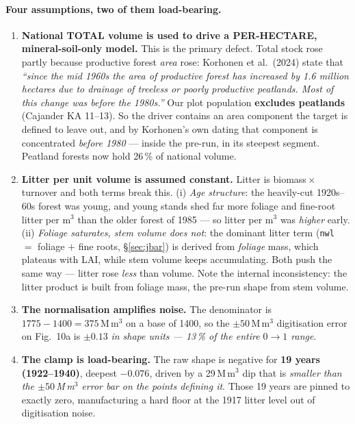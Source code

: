 \documentclass[11pt]{article}
\begin{document}
\paragraph{Four assumptions, two of them load-bearing.}
\begin{enumerate}
\item \textbf{National TOTAL volume is used to drive a PER-HECTARE, mineral-soil-only model.}
      This is the primary defect. Total stock rose partly because productive forest \emph{area} rose:
      Korhonen et al.\ (2024) state that \emph{``since the mid 1960s the area of productive forest has
      increased by 1.6 million hectares due to drainage of treeless or poorly productive peatlands.
      Most of this change was before the 1980s.''} Our plot population \textbf{excludes peatlands}
      (Cajander KA 11--13). So the driver contains an area component the target is defined to leave
      out, and by Korhonen's own dating that component is concentrated \emph{before 1980} --- inside
      the pre-run, in its steepest segment. Peatland forests now hold 26\,\% of national volume.
\item \textbf{Litter per unit volume is assumed constant.} Litter is biomass\,$\times$\,turnover and
      both terms break this. (i) \emph{Age structure}: the heavily-cut 1920s--60s forest was young,
      and young stands shed far more foliage and fine-root litter per m$^3$ than the older forest of
      1985 --- so litter per m$^3$ was \emph{higher} early. (ii) \emph{Foliage saturates, stem volume
      does not}: the dominant litter term (\texttt{nwl} $=$ foliage $+$ fine roots, \S\ref{sec:jbar})
      is derived from \emph{foliage} mass, which plateaus with LAI, while stem volume keeps
      accumulating. Both push the same way --- litter rose \emph{less} than volume. Note the internal
      inconsistency: the litter product is built from foliage mass, the pre-run shape from stem volume.
\item \textbf{The normalisation amplifies noise.} The denominator is $1775-1400=375$\,M\,m$^3$ on a
      base of 1400, so the $\pm 50$\,M\,m$^3$ digitisation error on Fig.\ 10a is
      $\pm 0.13$ \emph{in shape units --- 13\,\% of the entire $0\to1$ range}.
\item \textbf{The clamp is load-bearing.} The raw shape is negative for \textbf{19 years
      (1922--1940)}, deepest $-0.076$, driven by a 29\,M\,m$^3$ dip that is \emph{smaller than the
      $\pm 50$\,M\,m$^3$ error bar on the points defining it}. Those 19 years are pinned to exactly
      zero, manufacturing a hard floor at the 1917 litter level out of digitisation noise.
\end{enumerate}
\end{document}
